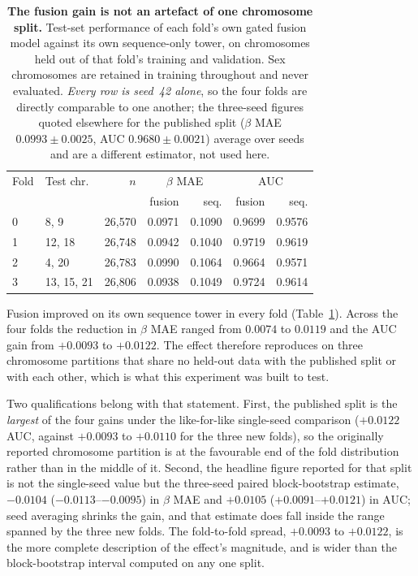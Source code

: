 \documentclass[10pt,letterpaper,twocolumn]{article}
\begin{document}
\begin{table}[!tbp]
\centering
\small
\caption{\textbf{The fusion gain is not an artefact of one chromosome split.}
Test-set performance of each fold's own gated fusion model against its own
sequence-only tower, on chromosomes held out of that fold's training and
validation. Sex chromosomes are retained in training throughout and never
evaluated. \emph{Every row is seed~42 alone}, so the four folds are directly
comparable to one another; the three-seed figures quoted elsewhere for the
published split ($\beta$ MAE $0.0993\pm0.0025$, AUC $0.9680\pm0.0021$) average
over seeds and are a different estimator, not used here.}
\label{tab:folds}
\setlength{\tabcolsep}{4pt}
\begin{tabular}{llrrrrr}
\hline
Fold & Test chr. & $n$ & \multicolumn{2}{c}{$\beta$ MAE} & \multicolumn{2}{c}{AUC} \\
 & & & fusion & seq. & fusion & seq. \\
\hline
0 & 8, 9 & 26,570 & 0.0971 & 0.1090 & 0.9699 & 0.9576 \\
1 & 12, 18 & 26,748 & 0.0942 & 0.1040 & 0.9719 & 0.9619 \\
2 & 4, 20 & 26,783 & 0.0990 & 0.1064 & 0.9664 & 0.9571 \\
3 & 13, 15, 21 & 26,806 & 0.0938 & 0.1049 & 0.9724 & 0.9614 \\
\hline
\end{tabular}
\end{table}

Fusion improved on its own sequence tower in every fold
(Table~\ref{tab:folds}). Across the four folds the reduction in $\beta$ MAE
ranged from $0.0074$ to $0.0119$ and the AUC gain from $+0.0093$ to $+0.0122$.
The effect therefore reproduces on three chromosome partitions that share no
held-out data with the published split or with each other, which is what this
experiment was built to test.

Two qualifications belong with that statement. First, the published split is
the \emph{largest} of the four gains under the like-for-like single-seed
comparison ($+0.0122$ AUC, against $+0.0093$ to $+0.0110$ for the three new
folds), so the originally reported chromosome partition is at the favourable
end of the fold distribution rather than in the middle of it. Second, the
headline figure reported for that split is not the single-seed value but the
three-seed paired block-bootstrap estimate, $-0.0104$ ($-0.0113$--$-0.0095$) in
$\beta$ MAE and $+0.0105$ ($+0.0091$--$+0.0121$) in AUC; seed averaging shrinks
the gain, and that estimate does fall inside the range spanned by the three new
folds. The fold-to-fold spread, $+0.0093$ to $+0.0122$, is the more complete
description of the effect's magnitude, and is wider than the block-bootstrap
interval computed on any one split.
\end{document}
